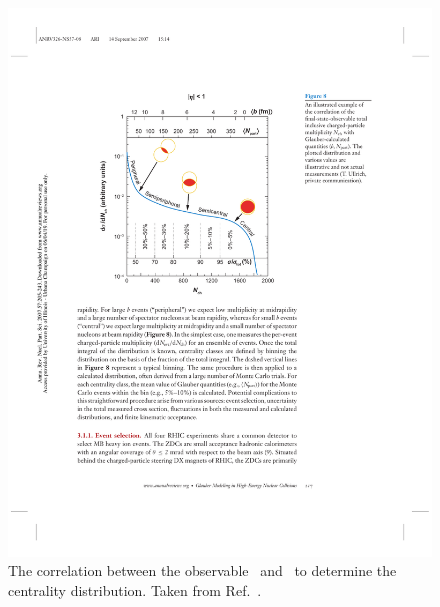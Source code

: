 \begin{figure}
\begin{center}
\begin{minipage}[b]{0.4\textwidth}
\includegraphics[width=\textwidth]{figures/theory/cent_estimate}
\caption{The correlation between the observable \Nch\ and \Npart\ to determine the centrality distribution.
Taken from Ref.~\cite{doi:10.1146/annurev.nucl.57.090506.123020}.}
\label{fig:cent_estimate}
  \end{minipage}
  \end{center}
\end{figure}










